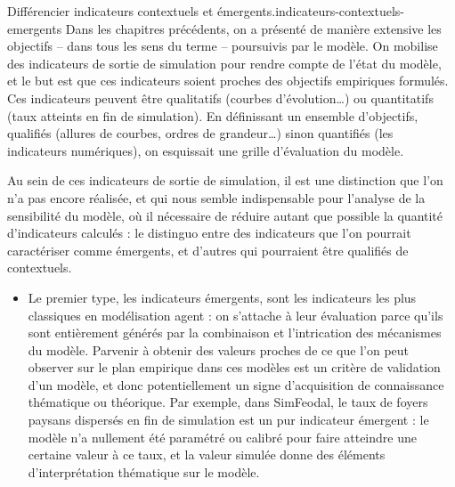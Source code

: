 \bigskip 
\begin{encadre}{Différencier indicateurs contextuels et émergents.}{indicateurs-contextuels-emergents}
Dans les chapitres précédents, on a présenté de manière extensive les objectifs -- dans tous les sens du terme -- poursuivis par le modèle.
On mobilise des indicateurs de sortie de simulation pour rendre compte de l'état du modèle, et le but est que ces indicateurs soient proches des objectifs empiriques formulés.
Ces indicateurs peuvent être qualitatifs (courbes d'évolution\ldots) ou quantitatifs (taux atteints en fin de simulation).
En définissant un ensemble d'objectifs, qualifiés (allures de courbes, ordres de grandeur\ldots) sinon quantifiés (les indicateurs numériques), on esquissait une grille d'évaluation du modèle.

Au sein de ces indicateurs de sortie de simulation, il est une distinction que l'on n’a pas encore réalisée, et qui nous semble indispensable pour l'analyse de la sensibilité du modèle, où il nécessaire de réduire autant que possible la quantité d'indicateurs calculés : le distinguo entre des indicateurs que l'on pourrait caractériser comme \og émergents\fg{}, et d'autres qui pourraient être qualifiés de \og contextuels\fg{}.

\begin{itemize}
	\item Le premier type, les indicateurs émergents, sont les indicateurs les plus classiques en modélisation agent : on s'attache à leur évaluation parce qu'ils sont entièrement générés par la combinaison et l'intrication des mécanismes du modèle.
	Parvenir à obtenir des valeurs proches de ce que l'on peut observer sur le plan empirique dans ces modèles est un critère de validation d'un modèle, et donc potentiellement un signe d'acquisition de connaissance thématique ou théorique.
	Par exemple, dans SimFeodal, le taux de foyers paysans dispersés en fin de simulation est un pur indicateur émergent : le modèle n'a nullement été paramétré ou calibré pour faire atteindre une certaine valeur à ce taux, et la valeur simulée donne des éléments d'interprétation thématique sur le modèle.
	

\end{itemize}
\end{encadre}
